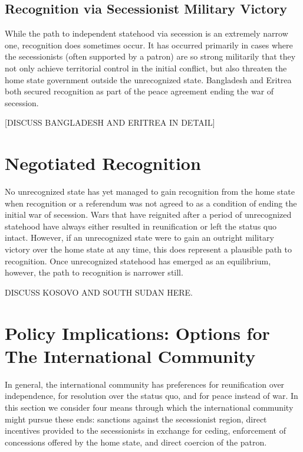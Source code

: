 \documentclass[12pt,letterpaper, notitlepage]{article}
\begin{document}
\subsection*{Recognition via Secessionist Military Victory}
While the path to independent statehood via secession is an extremely narrow one, recognition does sometimes occur. It has occurred primarily in cases where the secessionists (often supported by a patron) are so strong militarily that they not only achieve territorial control in the initial conflict, but also threaten the home state government outside the unrecognized state.  Bangladesh and Eritrea both secured recognition as part of the peace agreement ending the war of secession.  

[DISCUSS BANGLADESH AND ERITREA IN DETAIL]


\section*{Negotiated Recognition}
No unrecognized state has yet managed to gain recognition from the home state when recognition or a referendum was not agreed to as a condition of ending the initial war of secession. Wars that have reignited after a period of unrecognized statehood have always either resulted in reunification or left the status quo intact.  However, if an unrecognized state were to gain an outright military victory over the home state at any time, this does represent a plausible path to recognition. Once unrecognized statehood has emerged as an equilibrium, however, the path to recognition is narrower still.

DISCUSS KOSOVO AND SOUTH SUDAN HERE.


\section*{Policy Implications: Options for The International Community}
 In general, the international community has preferences for reunification over independence, for resolution over the status quo, and for peace instead of war.  In this section we consider  four means through which the international community might pursue these ends: sanctions against the secessionist region, direct incentives provided to the secessionists in exchange for ceding, enforcement of concessions offered by the home state, and direct coercion of the patron.
\end{document}
